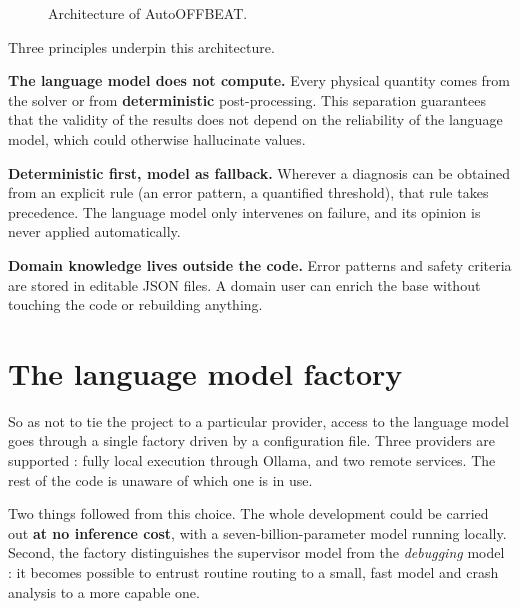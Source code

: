 \documentclass[12pt,a4paper]{report}
\begin{document}
\begin{figure}[htbp]
\caption[AutoOFFBEAT architecture]{Architecture of AutoOFFBEAT.}
\label{fig:archi}
\end{figure}

Three principles underpin this architecture.

\textbf{The language model does not compute.} Every physical quantity comes
from the solver or from \textbf{deterministic} post-processing. This separation
guarantees that the validity of the results does not depend on the reliability
of the language model, which could otherwise hallucinate values.

\textbf{Deterministic first, model as fallback.} Wherever a diagnosis can be
obtained from an explicit rule (an error pattern, a quantified threshold), that
rule takes precedence. The language model only intervenes on failure, and its
opinion is never applied automatically.

\textbf{Domain knowledge lives outside the code.} Error patterns and safety
criteria are stored in editable JSON files. A domain user can enrich the base
without touching the code or rebuilding anything.

\section{The language model factory}

So as not to tie the project to a particular provider, access to the language
model goes through a single factory driven by a configuration file. Three
providers are supported : fully local execution through Ollama, and two remote
services. The rest of the code is unaware of which one is in use.

Two things followed from this choice. The whole development could
be carried out \textbf{at no inference cost}, with a seven-billion-parameter
model running locally. Second, the factory distinguishes the supervisor model
from the \textit{debugging} model : it becomes possible to entrust routine
routing to a small, fast model and crash analysis to a more capable one.
\end{document}
